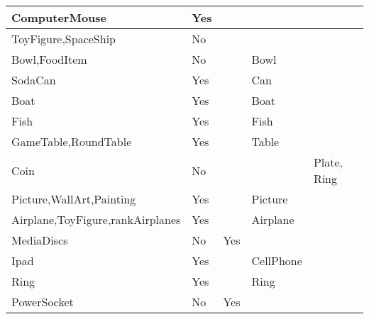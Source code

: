 \documentclass{article}
\begin{document}
\begin{longtable}{|l|l|l|l|l|}
ComputerMouse                            & Yes              &                                &                &                             \\ \hline
ToyFigure,SpaceShip                      & No               &                                &                &                             \\ \hline
Bowl,FoodItem                            & No               &                                & Bowl           &                             \\ \hline
SodaCan                                  & Yes              &                                & Can            &                             \\ \hline
Boat                                     & Yes              &                                & Boat           &                             \\ \hline
Fish                                     & Yes              &                                & Fish           &                             \\ \hline
GameTable,RoundTable                     & Yes              &                                & Table          &                             \\ \hline
Coin                                     & No               &                                &                & Plate, Ring                 \\ \hline
Picture,WallArt,Painting                 & Yes              &                                & Picture        &                             \\ \hline
Airplane,ToyFigure,rankAirplanes         & Yes              &                                & Airplane       &                             \\ \hline
MediaDiscs                               & No               & Yes                            &                &                             \\ \hline
Ipad                                     & Yes              &                                & CellPhone      &                             \\ \hline
Ring                                     & Yes              &                                & Ring           &                             \\ \hline
PowerSocket                              & No               & Yes                            &                &                             \\ \hline

\end{longtable}
\end{document}

